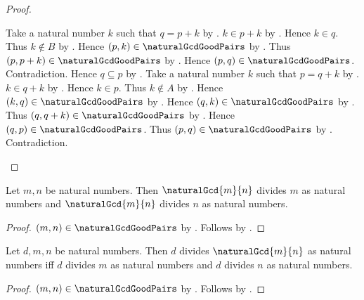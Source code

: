 \begin{proof}
    \begin{byCase}
            Take a natural number $k$ such that $q=p+k$
                by .
            $k\in p+k$
                by .
            Hence $k\in q$.
            Thus $k\notin B$ by .
            Hence $(p,k)\in\naturalGcdGoodPairs$
                by \auto.
            Thus $(p,p+k)\in\naturalGcdGoodPairs$
                by .
            Hence $(p,q)\in\naturalGcdGoodPairs$.
            Contradiction.
            Hence $q\subseteq p$
                by .
            Take a natural number $k$ such that $p=q+k$
                by .
            $k\in q+k$
                by .
            Hence $k\in p$.
            Thus $k\notin A$ by .
            Hence $(k,q)\in\naturalGcdGoodPairs$
                by \auto.
            Hence $(q,k)\in\naturalGcdGoodPairs$
                by .
            Thus $(q,q+k)\in\naturalGcdGoodPairs$
                by .
            Hence $(q,p)\in\naturalGcdGoodPairs$.
            Thus $(p,q)\in\naturalGcdGoodPairs$
                by .
            Contradiction.
    \end{byCase}
\end{proof}

\begin{theorem}\label{natural_gcd_common_divisor}
    Let $m,n$ be natural numbers.
    Then $\naturalGcd{m}{n}$ divides $m$ as natural numbers and
        $\naturalGcd{m}{n}$ divides $n$ as natural numbers.
\end{theorem}
\begin{proof}
    $(m,n)\in\naturalGcdGoodPairs$
        by .
    Follows by .
\end{proof}

\begin{theorem}\label{natural_gcd_universal}
    Let $d,m,n$ be natural numbers.
    Then $d$ divides $\naturalGcd{m}{n}$ as natural numbers iff
        $d$ divides $m$ as natural numbers and
        $d$ divides $n$ as natural numbers.
\end{theorem}
\begin{proof}
    $(m,n)\in\naturalGcdGoodPairs$
        by .
    Follows by .
\end{proof}

